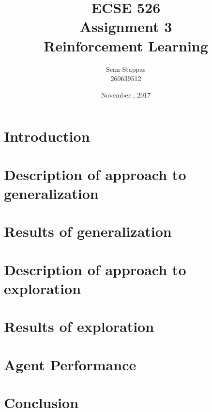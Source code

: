 \documentclass[a4paper,titlepage]{article}
\title{
	\textbf{ECSE 526 \\ Assignment 3}
	\\ \large Reinforcement Learning
}
\author{Sean Stappas \\ 260639512}
\date{November \nth{7}, 2017}
\begin{document}
	\sloppy
	\maketitle
	\twocolumn
	
	\section*{Introduction}
	
	
	\section{Description of approach to generalization}
	
	
	\section{Results of generalization}
	
	
	\section{Description of approach to exploration}
	
	
	\section{Results of exploration}
	
	
	\section{Agent Performance}

	\section*{Conclusion}
	
	
	
	
\end{document}
